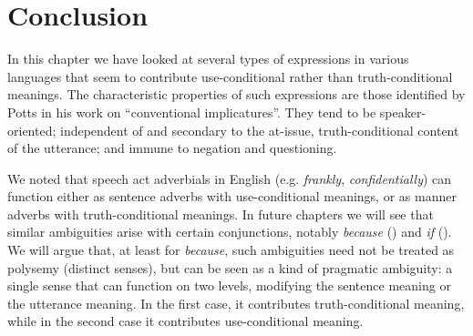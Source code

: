 \section{Conclusion}\label{sec:11.7}

In this chapter we have looked at several types of expressions in various languages that seem to contribute use-conditional rather than truth-conditional meanings. The characteristic properties of such expressions are those identified by Potts in his work on “conventional implicatures”. They tend to be speaker-oriented; independent of and secondary to the at-issue, truth-conditional content of the utterance; and immune to negation and questioning.



We noted that speech act adverbials in English (e.g. \textit{frankly}, \textit{confidentially}) can function either as sentence adverbs with use-conditional meanings, or as manner adverbs with truth-conditional meanings. In future chapters we will see that similar ambiguities arise with certain conjunctions, notably \textit{because} () and \textit{if} (). We will argue that, at least for \textit{because}, such ambiguities need not be treated as polysemy (distinct senses), but can be seen as a kind of pragmatic ambiguity: a single sense that can function on two levels, modifying the sentence meaning or the utterance meaning. In the first case, it contributes truth-conditional meaning, while in the second case it contributes use-conditional meaning.



